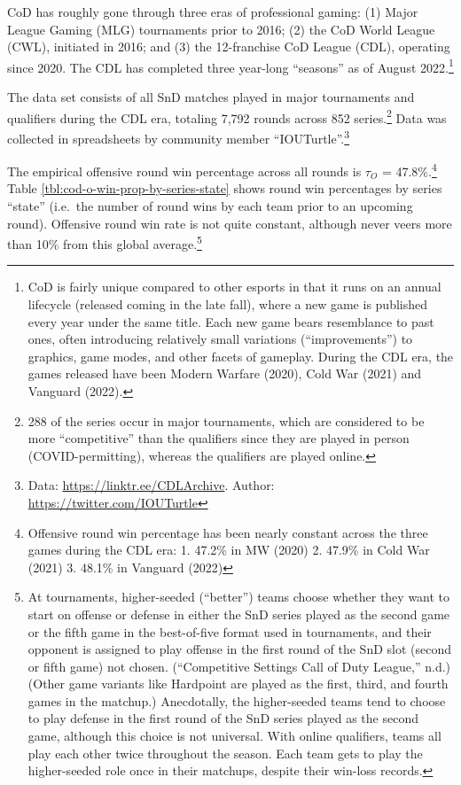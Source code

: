 \documentclass{article}
\begin{document}
CoD has roughly gone through three eras of professional gaming: (1)
Major League Gaming (MLG) tournaments prior to 2016; (2) the CoD World
League (CWL), initiated in 2016; and (3) the 12-franchise CoD League
(CDL), operating since 2020. The CDL has completed three year-long
``seasons'' as of August 2022.\footnote{CoD is fairly unique compared to
  other esports in that it runs on an annual lifecycle (released coming
  in the late fall), where a new game is published every year under the
  same title. Each new game bears resemblance to past ones, often
  introducing relatively small variations (``improvements'') to
  graphics, game modes, and other facets of gameplay. During the CDL
  era, the games released have been Modern Warfare (2020), Cold War
  (2021) and Vanguard (2022).}

The data set consists of all SnD matches played in major tournaments and
qualifiers during the CDL era, totaling 7,792 rounds across 852
series.\footnote{288 of the series occur in major tournaments, which are
  considered to be more ``competitive'' than the qualifiers since they
  are played in person (COVID-permitting), whereas the qualifiers are
  played online.} Data was collected in spreadsheets by community member
``IOUTurtle''.\footnote{Data: \url{https://linktr.ee/CDLArchive}.
  Author: \url{https://twitter.com/IOUTurtle}}

The empirical offensive round win percentage across all rounds is
\(\tau_O\) = 47.8\%.\footnote{Offensive round win percentage has been
  nearly constant across the three games during the CDL era: 1. 47.2\%
  in MW (2020) 2. 47.9\% in Cold War (2021) 3. 48.1\% in Vanguard (2022)}
Table \ref{tbl:cod-o-win-prop-by-series-state} shows round win
percentages by series ``state'' (i.e.~the number of round wins by each
team prior to an upcoming round). Offensive round win rate is not quite
constant, although never veers more than 10\% from this global
average.\footnote{At tournaments, higher-seeded (``better'') teams
  choose whether they want to start on offense or defense in either the
  SnD series played as the second game or the fifth game in the
  best-of-five format used in tournaments, and their opponent is
  assigned to play offense in the first round of the SnD slot (second or
  fifth game) not chosen. ({``Competitive Settings \textbar{} Call of
  Duty League,''} n.d.) (Other game variants like Hardpoint are played
  as the first, third, and fourth games in the matchup.) Anecdotally,
  the higher-seeded teams tend to choose to play defense in the first
  round of the SnD series played as the second game, although this
  choice is not universal. With online qualifiers, teams all play each
  other twice throughout the season. Each team gets to play the
  higher-seeded role once in their matchups, despite their win-loss
  records.}
\end{document}
